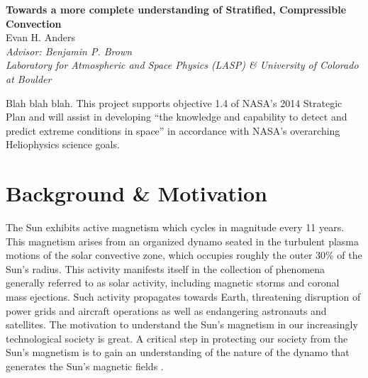 \documentclass[aps, pre, onecolumn, nofootinbib, notitlepage, groupedaddress, amsfonts, amssymb, amsmath, longbibliography]{revtex4-1}
\begin{document}
\begin{center}
   \large\textbf{Towards a more complete understanding of Stratified, Compressible Convection}\\
   \vspace{0.4cm}
   \large{Evan H. Anders}\\
   \vspace{0.4cm}
   \normalsize\textit{Advisor: Benjamin P. Brown}\\
   \normalsize\textit{Laboratory for Atmospheric and Space Physics (LASP) \& University of Colorado at Boulder}\\
\end{center}


\begin{center}
\begin{changemargin}{0.5in}{0.5in}
Blah blah blah. This project supports objective 1.4 of NASA's 2014 Strategic Plan
	and will assist in developing ``the
	knowledge and capability to detect and predict extreme conditions in
	space'' in accordance with NASA's overarching Heliophysics science goals.
\end{changemargin}
\end{center}

\vspace{-0.25in}



\section{Background \& Motivation}
The Sun exhibits active magnetism which cycles in magnitude every 11 years.
This magnetism arises from an 
organized dynamo seated in the turbulent plasma
motions of the solar convective zone, which occupies roughly the outer 30\%
of the Sun's radius. This activity manifests itself in the collection of phenomena generally
referred to as solar activity, including magnetic storms and coronal mass
ejections.  Such activity propagates towards Earth, threatening disruption of 
power grids and aircraft operations as well as endangering astronauts and satellites.
The motivation to understand the Sun's magnetism in our increasingly technological society
is great.  A critical step in protecting our society from the Sun's magnetism is 
to gain an understanding of the nature of the dynamo that generates the Sun's magnetic fields
\cite{nordlund&all2009, charbonneau2014}.
\end{document}
